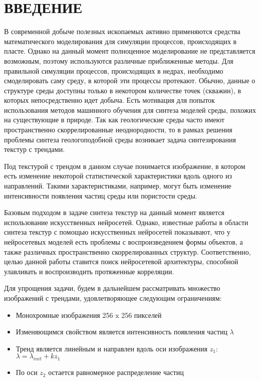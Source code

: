 \clearpage
\section*{\hfil ВВЕДЕНИЕ \hfil}
	В современной добыче полезных ископаемых активно применяются средства математического моделирования для симуляции процессов, происходящих в пласте. Однако на данный момент полноценное моделирование не представляется возможным, поэтому используются различные приближенные методы. Для правильной симуляции процессов, происходящих в недрах, необходимо смоделировать саму среду, в которой эти процессы протекают. Обычно, данные о структуре среды доступны только в некотором количестве точек (скважин), в которых непосредственно идет добыча. Есть мотивация для попыток использования методов машинного обучения для синтеза моделей среды, похожих на существующие в природе. Так как геологические среды часто имеют пространственно скоррелированные неоднородности, то в рамках решения проблемы синтеза геологоподобной среды возникает задача синтезирования текстур с трендами.
	
	Под текстурой с трендом в данном случае понимается изображение, в котором есть изменение некоторой статистической характеристики вдоль одного из направлений. Такими характеристиками, например, могут быть изменение интенсивности появления частиц среды или пористости среды.
	
	Базовым подходом в задаче синтеза текстур на данный момент является использование искусственных нейросетей. Однако, известные работы в области синтеза текстур с помощью искусственных нейросетей \cite{texture-synthesis-using-CNN, texture-networks} показывают, что у нейросетевых моделей есть проблемы с воспроизведением формы объектов, а также различных пространственно скоррелированных структур. Соответственно, целью данной работы ставится поиск нейросетевой архитектуры, способной улавливать и воспроизводить протяженные корреляции.
	
	Для упрощения задачи, будем в дальнейшем рассматривать множество изображений с трендами, удовлетворяющее следующим ограничениям:
	
	\begin{itemize}
		\item Монохромные изображения 256 x 256 пикселей
		\item Изменяющимся свойством является интенсивность появления частиц $\lambda$
		\item Тренд является линейным и направлен вдоль оси изображения $z_1$: 
		$ \lambda = \lambda_{init} + k z_1 $
		\item По оси $z_2$ остается равномерное распределение частиц
	\end{itemize}
	
